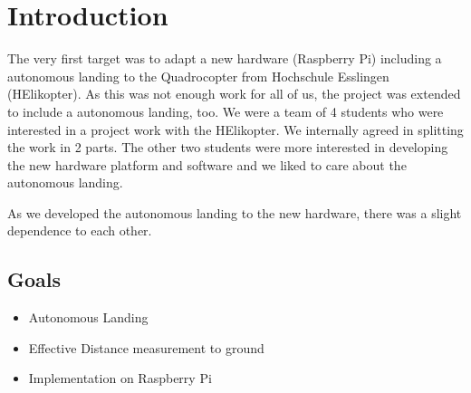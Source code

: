 
\chapter{Introduction}
\label{ch:intro}

The very first target was to adapt a new hardware (Raspberry Pi) including a autonomous landing to the Quadrocopter from Hochschule Esslingen (HElikopter). As this was not enough work for all of us, the project was extended to include a autonomous landing, too. We were a team of 4 students who were interested in a project work with the HElikopter. We internally agreed in splitting the work in 2 parts. The other two students were more interested in developing the new hardware platform and software and we liked to care about the autonomous landing.

As we developed the autonomous landing to the new hardware, there was a slight dependence to each other.



\section{Goals}


\begin{itemize}
	\item Autonomous Landing
	\item Effective Distance measurement to ground
	\item Implementation on Raspberry Pi
\end{itemize}